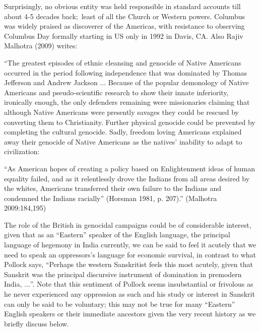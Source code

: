 Surprisingly, no obvious entity was held responsible in standard accounts till about 4-5 decades back; least of all the Church or Western powers. Columbus was widely praised as discoverer of the Americas, with resistance to observing Columbus Day formally starting in US only in 1992 in Davis, CA. Also Rajiv Malhotra (2009) writes: 
\begin{myquote}
“The greatest episodes of ethnic cleansing and genocide of Native Americans occurred in the period following independence that was dominated by Thomas Jefferson and Andrew Jackson $\ldots$ Because of the popular demonology of Native Americans and pseudo-scientific research to show their innate inferiority, ironically enough, the only defenders remaining were missionaries claiming that although Native Americans were presently savages they could be rescued by converting them to Christianity. Further physical genocide could be prevented by
completing the cultural genocide. Sadly, freedom loving Americans explained away their genocide of Native Americans as the natives’ inability to adapt to civilization: 

“As American hopes of creating a policy based on Enlightenment ideas of human equality failed, and as it relentlessly drove the Indians from all areas desired by the whites, Americans transferred their own failure to the Indians and condemned the Indians racially” (Horsman 1981, p. 207).”   	\hfill(Malhotra 2009:184,195)
\end{myquote}

The role of the British in genocidal campaigns could be of considerable interest, given that as an “Eastern” speaker of the English language, the principal language of hegemony in India currently, we can be said to feel it acutely that we need to speak an oppressors’s language for economic survival, in contrast to what Pollock says, “Perhaps the western Sanskritist feels this most acutely, given that Sanskrit was the principal discursive instrument of domination in premodern India, $\ldots$”. Note that this sentiment of Pollock seems insubstantial or frivolous as he never experienced any oppression as such and his study or interest in Sanskrit can only be said to be voluntary; this may not be true for many “Eastern” English speakers or their immediate ancestors given the very recent history as we briefly discuss below.


